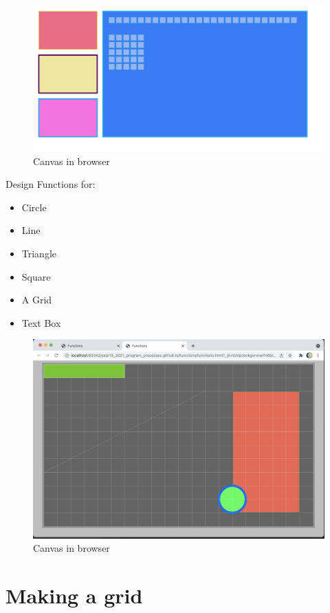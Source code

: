 \documentclass[a4paper,12pt]{article}
\begin{document}

\begin{figure}[!h]
	\centering
	\includegraphics[width=15cm, angle=0, origin=c]{functions/rectangles.png}
	\caption{Canvas in browser}
\end{figure}
Design Functions for:
\begin{itemize}
	\item Circle
	\item Line
	\item Triangle
	\item Square
	\item A Grid
	\item Text Box
\end{itemize}
\begin{figure}[!h]
	\centering
	\includegraphics[width=15cm, angle=0, origin=c]{functions/morewithfunctions.png}
	\caption{Canvas in browser}
\end{figure}
\newpage
\section{Making a grid}
\newpage
\end{document}
